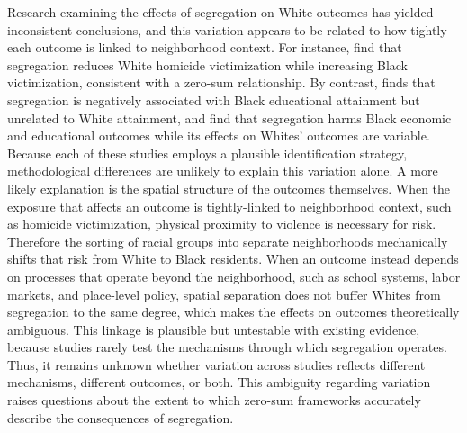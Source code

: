\documentclass[11pt]{article}
\begin{document}
Research examining the effects of segregation on White outcomes has yielded inconsistent conclusions, and this variation appears to be related to how tightly each outcome is linked to neighborhood context. For instance, \citet{light_segregation_2019} find that segregation reduces White homicide victimization while increasing Black victimization, consistent with a zero-sum relationship. By contrast, \citet{quillian_does_2014} finds that segregation is negatively associated with Black educational attainment but unrelated to White attainment, and \citet{cutler_are_1997} find that segregation harms Black economic and educational outcomes while its effects on Whites' outcomes are variable. Because each of these studies employs a plausible identification strategy, methodological differences are unlikely to explain this variation alone. A more likely explanation is the spatial structure of the outcomes themselves. When the exposure that affects an outcome is tightly-linked to neighborhood context, such as homicide victimization, physical proximity to violence is necessary for risk. Therefore the sorting of racial groups into separate neighborhoods mechanically shifts that risk from White to Black residents. When an outcome instead depends on processes that operate beyond the neighborhood, such as school systems, labor markets, and place-level policy, spatial separation does not buffer Whites from segregation to the same degree, which makes the effects on outcomes theoretically ambiguous. This linkage is plausible but untestable with existing evidence, because studies rarely test the mechanisms through which segregation operates. Thus, it remains unknown whether variation across studies reflects different mechanisms, different outcomes, or both. This ambiguity regarding variation raises questions about the extent to which zero-sum frameworks accurately describe the consequences of segregation.
\end{document}
